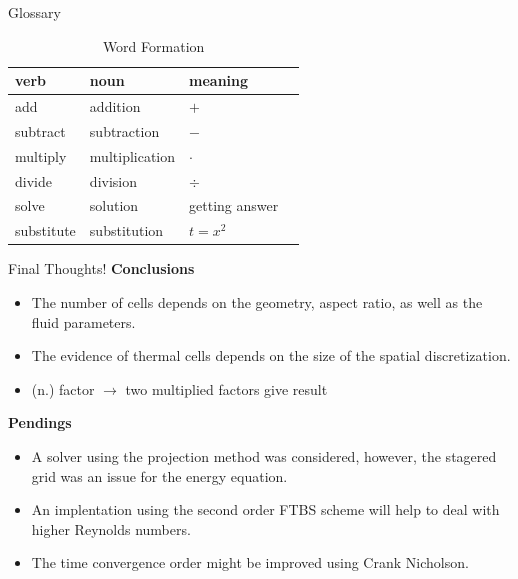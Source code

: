 \documentclass[final]{beamer}
\newlength{\onecolwid}
\begin{document}
\begin{frame}[t]
\begin{columns}[t]
\begin{column}{\onecolwid}


\begin{block}{Glossary}

\begin{table}
\vspace{2ex}
\begin{tabular}{l l l l}
\toprule
\textbf{verb} & \textbf{noun} & \textbf{meaning}\\
\midrule
add & addition & $+$ \\
subtract & subtraction & $-$ \\
multiply & multiplication & $\cdot$ \\
divide & division & $\div$ \\
solve & solution & getting answer \\
substitute & substitution & $t=x^2$ \\



\bottomrule
\end{tabular}
\caption{Word Formation}
\end{table}


\end{block}


\begin{alertblock}{Final Thoughts!}
\textbf{Conclusions}
\begin{itemize}
\item The number of cells depends on the geometry, aspect ratio, as well as the fluid parameters.
\item The evidence of thermal cells depends on the size of the spatial discretization.
\item (n.) factor $\rightarrow$ two multiplied factors give result
\end{itemize}
\textbf{Pendings}
\begin{itemize}
\item A solver using the projection method was considered, however, the stagered grid was an issue for the energy equation.
\item An implentation using the second order FTBS scheme will help to deal with higher Reynolds numbers.
\item The time convergence order might be improved using Crank Nicholson.
\end{itemize}


\end{alertblock}
\end{column}
\end{columns}
\end{frame}
\end{document}

